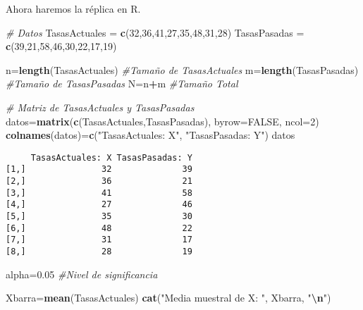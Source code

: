 \documentclass[
  a4paper,
  oneside,
  openany]{book}
\newenvironment{Shaded}{\begin{snugshade}}{\end{snugshade}}
\newcommand{\AttributeTok}[1]{\textcolor[rgb]{0.13,0.29,0.53}{#1}}
\newcommand{\CommentTok}[1]{\textcolor[rgb]{0.56,0.35,0.01}{\textit{#1}}}
\newcommand{\ConstantTok}[1]{\textcolor[rgb]{0.56,0.35,0.01}{#1}}
\newcommand{\DecValTok}[1]{\textcolor[rgb]{0.00,0.00,0.81}{#1}}
\newcommand{\FloatTok}[1]{\textcolor[rgb]{0.00,0.00,0.81}{#1}}
\newcommand{\FunctionTok}[1]{\textcolor[rgb]{0.13,0.29,0.53}{\textbf{#1}}}
\newcommand{\NormalTok}[1]{#1}
\newcommand{\OtherTok}[1]{\textcolor[rgb]{0.56,0.35,0.01}{#1}}
\newcommand{\SpecialCharTok}[1]{\textcolor[rgb]{0.81,0.36,0.00}{\textbf{#1}}}
\newcommand{\StringTok}[1]{\textcolor[rgb]{0.31,0.60,0.02}{#1}}
\begin{document}
Ahora haremos la réplica en R.

\begin{Shaded}
\begin{Highlighting}[]
\CommentTok{\# Datos}
\NormalTok{TasasActuales }\OtherTok{=} \FunctionTok{c}\NormalTok{(}\DecValTok{32}\NormalTok{,}\DecValTok{36}\NormalTok{,}\DecValTok{41}\NormalTok{,}\DecValTok{27}\NormalTok{,}\DecValTok{35}\NormalTok{,}\DecValTok{48}\NormalTok{,}\DecValTok{31}\NormalTok{,}\DecValTok{28}\NormalTok{)}
\NormalTok{TasasPasadas }\OtherTok{=} \FunctionTok{c}\NormalTok{(}\DecValTok{39}\NormalTok{,}\DecValTok{21}\NormalTok{,}\DecValTok{58}\NormalTok{,}\DecValTok{46}\NormalTok{,}\DecValTok{30}\NormalTok{,}\DecValTok{22}\NormalTok{,}\DecValTok{17}\NormalTok{,}\DecValTok{19}\NormalTok{)}

\NormalTok{n}\OtherTok{=}\FunctionTok{length}\NormalTok{(TasasActuales)  }\CommentTok{\#Tamaño de TasasActuales}
\NormalTok{m}\OtherTok{=}\FunctionTok{length}\NormalTok{(TasasPasadas)   }\CommentTok{\#Tamaño de TasasPasadas}
\NormalTok{N}\OtherTok{=}\NormalTok{n}\SpecialCharTok{+}\NormalTok{m                    }\CommentTok{\#Tamaño Total}

\CommentTok{\# Matriz de TasasActuales y TasasPasadas}
\NormalTok{datos}\OtherTok{=}\FunctionTok{matrix}\NormalTok{(}\FunctionTok{c}\NormalTok{(TasasActuales,TasasPasadas), }\AttributeTok{byrow=}\ConstantTok{FALSE}\NormalTok{, }\AttributeTok{ncol=}\DecValTok{2}\NormalTok{)}
\FunctionTok{colnames}\NormalTok{(datos)}\OtherTok{=}\FunctionTok{c}\NormalTok{(}\StringTok{"TasasActuales: X"}\NormalTok{, }\StringTok{"TasasPasadas: Y"}\NormalTok{)}
\NormalTok{datos}
\end{Highlighting}
\end{Shaded}

\begin{verbatim}
     TasasActuales: X TasasPasadas: Y
[1,]               32              39
[2,]               36              21
[3,]               41              58
[4,]               27              46
[5,]               35              30
[6,]               48              22
[7,]               31              17
[8,]               28              19
\end{verbatim}

\begin{Shaded}
\begin{Highlighting}[]
\NormalTok{alpha}\OtherTok{=}\FloatTok{0.05}  \CommentTok{\#Nivel de significancia }

\NormalTok{Xbarra}\OtherTok{=}\FunctionTok{mean}\NormalTok{(TasasActuales)}
\FunctionTok{cat}\NormalTok{(}\StringTok{"Media muestral de X: "}\NormalTok{, Xbarra, }\StringTok{"}\SpecialCharTok{\textbackslash{}n}\StringTok{"}\NormalTok{)}
\end{Highlighting}
\end{Shaded}
\end{document}
